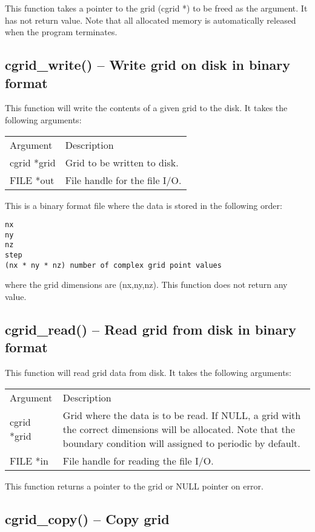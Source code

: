 \documentclass[12pt,letterpaper]{report}
\begin{document}
This function takes a pointer to the grid (cgrid *) to be freed as the argument. It has not return value. Note that all allocated memory is automatically released when the program terminates.

\subsection{cgrid\_write() -- Write grid on disk in binary format}

This function will write the contents of a given grid to the disk. It takes the following arguments:
\begin{longtable}{p{} p{}}
Argument & Description\\
\cline{1-2}
cgrid *grid & Grid to be written to disk.\\
FILE *out & File handle for the file I/O.\\
\end{longtable}
\noindent
This is a binary format file where the data is stored in the following order:
\begin{verbatim}
nx
ny
nz
step
(nx * ny * nz) number of complex grid point values
\end{verbatim}
where the grid dimensions are (nx,ny,nz). This function does not return any value.

\subsection{cgrid\_read() -- Read grid from disk in binary format}

This function will read grid data from disk. It takes the following arguments:
\begin{longtable}{p{} p{}}
Argument & Description\\
\cline{1-2}
cgrid *grid & Grid where the data is to be read. If NULL, a grid with the correct dimensions will be allocated. Note that the boundary condition will assigned to periodic by default.\\
FILE *in & File handle for reading the file I/O.\\
\end{longtable}
This function returns a pointer to the grid or NULL pointer on error.

\subsection{cgrid\_copy() -- Copy grid}
\end{document}
